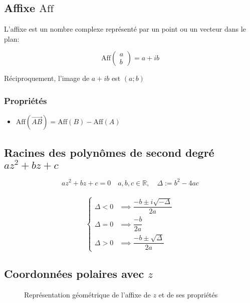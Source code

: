 \documentclass{article}
\newcommand{\im}{\text{Im}\,}
\newcommand{\re}{\text{Re}\,}
\newcommand{\R}{\mathds{R}}
\newcommand{\Aff}{\text{Aff}}
\newcommand{\vect}[1]{\overrightarrow{#1}}
\begin{document}
\subsection{Affixe $\Aff$}

L'affixe est un nombre complexe représenté par un point ou un vecteur dans le plan:

\[\Aff \begin{pmatrix} a \\ b \end{pmatrix} = a + ib\]

Réciproquement, l'image de $a+ib$ est $(a; b)$

\subsubsection{Propriétés}
\begin{itemize}
    \item $\Aff(\vect{AB}) = \Aff(B) - \Aff(A)$
\end{itemize}

\subsection{Racines des polynômes de second degré $az^2+bz+c$}

\[az^2+bz+c = 0\quad a, b, c \in \R,\quad\Delta := b^2-4ac\]\\
$$
\begin{cases}
\Delta < 0 &\implies \dfrac{-b\pm i\sqrt{-\Delta}}{2a}  \\
\Delta = 0 &\implies \dfrac{-b}{2a} \\
\Delta > 0 &\implies \dfrac{-b\pm\sqrt{\Delta}}{2a}
\end{cases}
$$

\subsection{Coordonnées polaires avec $z$}
\begin{figure}[h]
    \centering
    \caption{Représentation géométrique de l'affixe de $z$ et de ses propriétés}
    \label{fig:my_label}
\end{figure}
\end{document}
